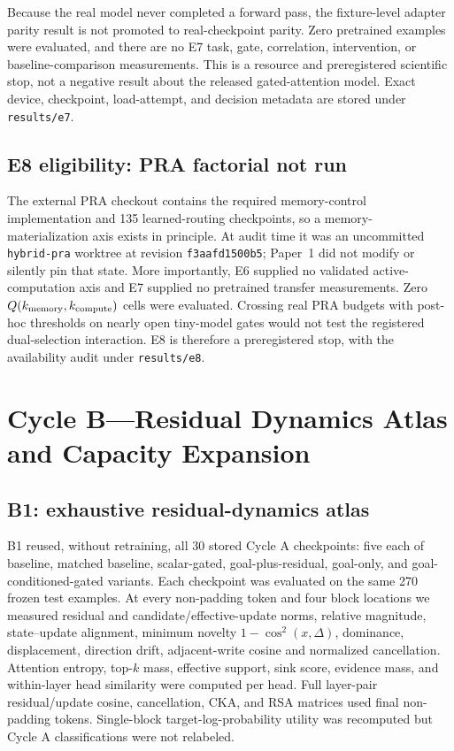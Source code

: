 \documentclass[10pt]{article}
\begin{document}
Because the real model never completed a forward pass, the fixture-level adapter parity result is not promoted to real-checkpoint parity. Zero pretrained examples were evaluated, and there are no E7 task, gate, correlation, intervention, or baseline-comparison measurements. This is a resource and preregistered scientific stop, not a negative result about the released gated-attention model. Exact device, checkpoint, load-attempt, and decision metadata are stored under \texttt{results/e7}.

\subsection{E8 eligibility: PRA factorial not run}
The external PRA checkout contains the required memory-control implementation and 135 learned-routing checkpoints, so a memory-materialization axis exists in principle. At audit time it was an uncommitted \texttt{hybrid-pra} worktree at revision \texttt{f3aafd1500b5}; Paper~1 did not modify or silently pin that state. More importantly, E6 supplied no validated active-computation axis and E7 supplied no pretrained transfer measurements. Zero $Q(k_{\rm memory},k_{\rm compute})$ cells were evaluated. Crossing real PRA budgets with post-hoc thresholds on nearly open tiny-model gates would not test the registered dual-selection interaction. E8 is therefore a preregistered stop, with the availability audit under \texttt{results/e8}.

\section{Cycle B---Residual Dynamics Atlas and Capacity Expansion}
\subsection{B1: exhaustive residual-dynamics atlas}
B1 reused, without retraining, all 30 stored Cycle A checkpoints: five each of baseline, matched baseline, scalar-gated, goal-plus-residual, goal-only, and goal-conditioned-gated variants. Each checkpoint was evaluated on the same 270 frozen test examples. At every non-padding token and four block locations we measured residual and candidate/effective-update norms, relative magnitude, state--update alignment, minimum novelty $1-\cos^2(x,\Delta)$, dominance, displacement, direction drift, adjacent-write cosine and normalized cancellation. Attention entropy, top-$k$ mass, effective support, sink score, evidence mass, and within-layer head similarity were computed per head. Full layer-pair residual/update cosine, cancellation, CKA, and RSA matrices used final non-padding tokens. Single-block target-log-probability utility was recomputed but Cycle A classifications were not relabeled.
\end{document}
